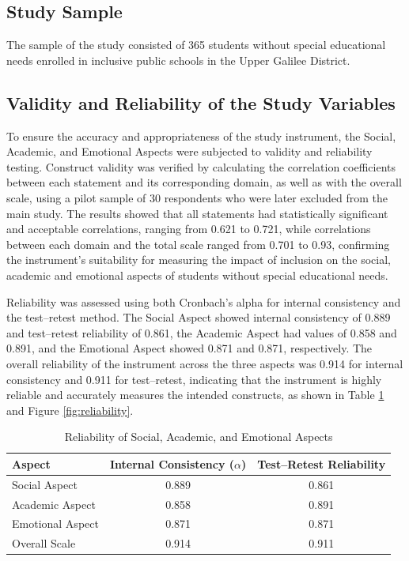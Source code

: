 \documentclass[10pt]{NSP1}
\begin{document}
	\subsection{Study Sample}

	The sample of the study consisted of 365 students without special educational needs enrolled in inclusive public schools in the Upper Galilee District.

	\subsection{Validity and Reliability of the Study Variables}

	To ensure the accuracy and appropriateness of the study instrument, the Social, Academic, and Emotional Aspects were subjected to validity and reliability testing. Construct validity was verified by calculating the correlation coefficients between each statement and its corresponding domain, as well as with the overall scale, using a pilot sample of 30 respondents who were later excluded from the main study. The results showed that all statements had statistically significant and acceptable correlations, ranging from 0.621 to 0.721, while correlations between each domain and the total scale ranged from 0.701 to 0.93, confirming the instrument's suitability for measuring the impact of inclusion on the social, academic and emotional aspects of students without special educational needs.

	Reliability was assessed using both Cronbach's alpha for internal consistency and the test--retest method. The Social Aspect showed internal consistency of 0.889 and test--retest reliability of 0.861, the Academic Aspect had values of 0.858 and 0.891, and the Emotional Aspect showed 0.871 and 0.871, respectively. The overall reliability of the instrument across the three aspects was 0.914 for internal consistency and 0.911 for test--retest, indicating that the instrument is highly reliable and accurately measures the intended constructs, as shown in Table \ref{tab:reliability} and Figure \ref{fig:reliability}.

	\begin{table}[H]
		\centering
		\caption{Reliability of Social, Academic, and Emotional Aspects}
		\label{tab:reliability}
		\begin{tabular}{lcc}
			\toprule
			\textbf{Aspect} & \textbf{Internal Consistency ($\alpha$)} & \textbf{Test--Retest Reliability} \\
			\midrule
			Social Aspect     & 0.889 & 0.861 \\
			Academic Aspect   & 0.858 & 0.891 \\
			Emotional Aspect  & 0.871 & 0.871 \\
			Overall Scale     & 0.914 & 0.911 \\
			\bottomrule
		\end{tabular}
	\end{table}
\end{document}
